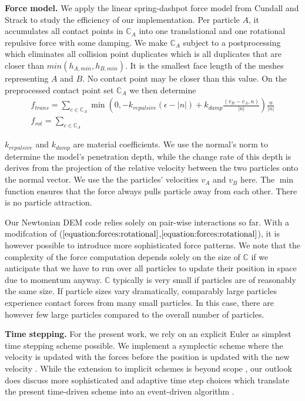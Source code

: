 {\bf Force model.}
We apply the linear spring-dashpot force model from Cundall and
Strack \cite{19,Samiei} to study the efficiency of our implementation.
Per particle $A$, it accumulates all contact points in $\mathbb{C}_A$ into one
translational and one rotational repulsive force with some damping.
We make $\mathbb{C}_A$ subject to a postprocessing which eliminates all
collision point duplicates which is all duplicates that are closer than
$min(h_{A,min},h_{B,min})$. 
It is the smallest face length of the meshes representing $A$ and $B$.
No contact point may be closer than this value.
On the preprocessed contact point set $\mathbb{C}_A$ we then determine
\begin{eqnarray}
  f_{trans} = \sum _{c \in \mathbb{C}_A} 
  \min \left( 0, -k_{repulsive} (\epsilon - |n|) + k_{damp}
  \frac{(v_B-v_A,n)}{|n|}  \right) \frac{n}{|n|}
  \label{equation:forces:translational}
  \\
  f_{rot} = \sum _{c \in \mathbb{C}_A}
  \label{equation:forces:rotational}
\end{eqnarray}

\noindent
$k_{repulsive}$ and $k_{damp}$ are material coefficients. 
We use the normal's norm to determine the model's penetration depth, while the
change rate of this depth is derives from the projection of the relative
velocity between the two particles onto the normal vector.
We use the the particles' velocities $v_A$ and $v_B$ here.
The $\min $ function ensures that the force always pulls particle away from each
other. 
There is no particle attraction.


Our Newtonian DEM code relies solely on pair-wise interactions so far. 
With a modifcation of
($\ref{equation:forces:rotational}$,$\ref{equation:forces:rotational}$), it is
however possible to introduce more sophisticated force patterns.
We note that the complexity of the force computation depends solely on the size
of $\mathbb{C}$ if we anticipate that we have to run over all particles to
update their position in space due to momentum anyway.
$\mathbb{C}$ typically is very small if particles are of reasonably the same
size. 
If particle sizes vary dramatically, comparably large particles experience
contact forces from many small particles.
In this case, there are however few large particles compared to the overall
number of particles.


{\bf Time stepping.}
For the present work, we rely on an explicit Euler as simplest time stepping
scheme possible.
We implement a symplectic scheme where the velocity is updated with the forces
before the position is updated with the new velocity \cite{Samiei,37}. 
While the extension to implicit schemes is beyond scope \cite{xxx}, our outlook
does discuss more sophisticated and adaptive time step choices which translate
the present time-driven scheme into an event-driven algorithm \cite{xxx}.

